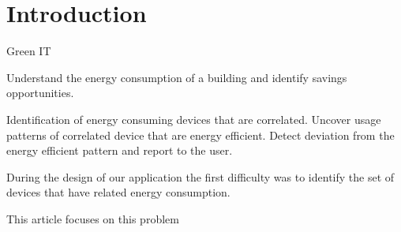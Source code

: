 \section{Introduction}
Green IT

Understand the energy consumption of a building and identify savings opportunities.

Identification of energy consuming devices that are correlated.
Uncover usage patterns of correlated device that are energy efficient.
Detect deviation from the energy efficient pattern and report to the user.

During the design of our application the first difficulty was to identify the set of devices that have related energy consumption.

This article focuses on this problem